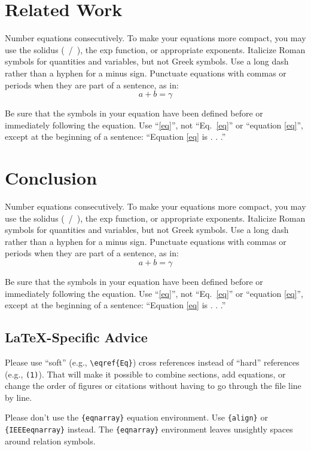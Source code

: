 \documentclass[conference]{IEEEtran}
\begin{document}
\section{Related Work}
Number equations consecutively. To make your 
equations more compact, you may use the solidus (~/~), the exp function, or 
appropriate exponents. Italicize Roman symbols for quantities and variables, 
but not Greek symbols. Use a long dash rather than a hyphen for a minus 
sign. Punctuate equations with commas or periods when they are part of a 
sentence, as in:
\begin{equation}
a+b=\gamma\label{eq}
\end{equation}

Be sure that the 
symbols in your equation have been defined before or immediately following 
the equation. Use ``\eqref{eq}'', not ``Eq.~\eqref{eq}'' or ``equation \eqref{eq}'', except at 
the beginning of a sentence: ``Equation \eqref{eq} is . . .''


\section{Conclusion}
Number equations consecutively. To make your 
equations more compact, you may use the solidus (~/~), the exp function, or 
appropriate exponents. Italicize Roman symbols for quantities and variables, 
but not Greek symbols. Use a long dash rather than a hyphen for a minus 
sign. Punctuate equations with commas or periods when they are part of a 
sentence, as in:
\begin{equation}
a+b=\gamma\label{eq}
\end{equation}

Be sure that the 
symbols in your equation have been defined before or immediately following 
the equation. Use ``\eqref{eq}'', not ``Eq.~\eqref{eq}'' or ``equation \eqref{eq}'', except at 
the beginning of a sentence: ``Equation \eqref{eq} is . . .''

\subsection{\LaTeX-Specific Advice}

Please use ``soft'' (e.g., \verb|\eqref{Eq}|) cross references instead
of ``hard'' references (e.g., \verb|(1)|). That will make it possible
to combine sections, add equations, or change the order of figures or
citations without having to go through the file line by line.

Please don't use the \verb|{eqnarray}| equation environment. Use
\verb|{align}| or \verb|{IEEEeqnarray}| instead. The \verb|{eqnarray}|
environment leaves unsightly spaces around relation symbols.
\end{document}
